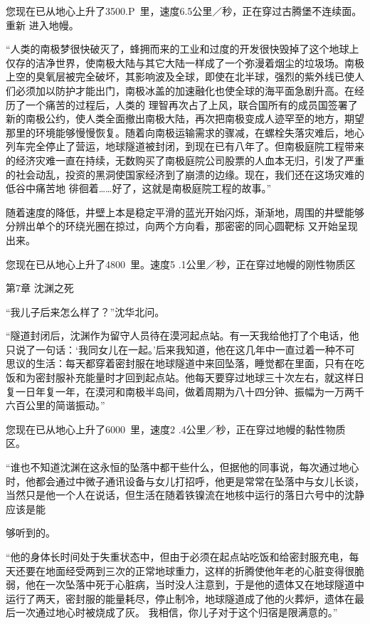 \documentclass{article}
\begin{document}
您现在已从地心上升了3500.P~里，速度6.5公里／秒，正在穿过古腾堡不连续面。重新
进入地幔。 

“人类的南极梦很快破灭了，蜂拥而来的工业和过度的开发很快毁掉了这个地球上仅存的洁净世界，使南极大陆与其它大陆一样成了一个弥漫着烟尘的垃圾场。南极上空的臭氧层被完全破坏，其影响波及全球，即使在北半球，强烈的紫外线已使人们必须加以防护才能出门，南极冰盖的加速融化也使全球的海平面急剧升高。在经历了一个痛苦的过程后，人类的
\newpage
理智再次占了上风，联合国所有的成员国签署了新的南极公约，使人类全面撤出南极大陆，再次把南极变成人迹罕至的地方，期望那里的环境能够慢慢恢复。随着向南极运输需求的骤减，在螺栓失落灾难后，地心列车完全停止了营运，地球隧道被封闭，到现在已有八年了。但南极庭院工程带来的经济灾难一直在持续，无数购买了南极庭院公司股票的人血本无归，引发了严重的社会动乱，投资的黑洞使国家经济到了崩溃的边缘。现在，我们还在这场灾难的低谷中痛苦地
徘徊着……好了，这就是南极庭院工程的故事。” 

随着速度的降低，井壁上本是稳定平滑的蓝光开始闪烁，渐渐地，周围的井壁能够分辨出单个的环绕光圈在掠过，向两个方向看，那密密的同心圆靶标
又开始呈现出来。 

您现在已从地心上升了4800~里。速度5
.1公里／秒，正在穿过地幔的刚性物质区 


第7章 沈渊之死 

\newpage


“我儿子后来怎么样了？”沈华北问。 

“隧道封闭后，沈渊作为留守人员待在漠河起点站。有一天我给他打了个电话，他只说了一句话：‘我同女儿在一起。’后来我知道，他在这几年中一直过着一种不可思议的生活：每天都穿着密封服在地球隧道中来回坠落，睡觉都在里面，只有在吃饭和为密封服补充能量时才回到起点站。他每天要穿过地球三十次左右，就这样日复一日年复一年，在漠河和南极半岛间，做着周期为八十四分钟、振幅为一万两千
六百公里的简谐振动。” 

您现在已从地心上升了6000~里，速度2
.4公里／秒，正在穿过地幔的黏性物质区。 

“谁也不知道沈渊在这永恒的坠落中都干些什么，但据他的同事说，每次通过地心时，他都会通过中微子通讯设备与女儿打招呼，他更是常常在坠落中与女儿长谈，当然只是他一个人在说话，但生活在随着铁镍流在地核中运行的落日六号中的沈静应该是能

\newpage
够听到的。 

“他的身体长时间处于失重状态中，但由于必须在起点站吃饭和给密封服充电，每天还要在地面经受两到三次的正常地球重力，这样的折腾使他年老的心脏变得很脆弱，他在一次坠落中死于心脏病，当时没人注意到，于是他的遗体又在地球隧道中运行了两天，密封服的能量耗尽，停止制冷，地球隧道成了他的火葬炉，遗体在最后一次通过地心时被烧成了灰。
我相信，你儿子对于这个归宿是限满意的。” 
\end{document}
